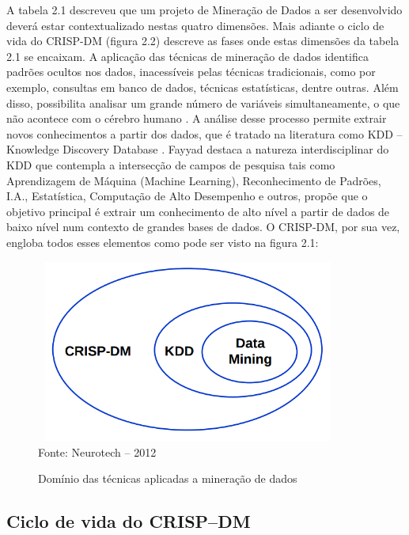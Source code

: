 A tabela 2.1 descreveu que um projeto de Mineração de Dados a ser desenvolvido deverá estar contextualizado nestas quatro dimensões. 
Mais adiante o ciclo de vida do CRISP-DM (figura 2.2) descreve as fases onde estas dimensões da tabela 2.1 se encaixam.
A aplicação das técnicas de mineração de dados identifica padrões ocultos nos dados, inacessíveis pelas técnicas tradicionais,
como por exemplo, consultas em banco de dados, técnicas estatísticas, dentre outras. Além disso, possibilita analisar um grande número de 
variáveis simultaneamente, o que não acontece com o cérebro humano \cite{possas1998data}. 
A análise desse processo permite extrair novos conhecimentos a partir dos dados, que é tratado na literatura como 
KDD -- Knowledge Discovery Database \cite{FayyadUeoutros}. Fayyad \cite{FayyadUeoutros} destaca a natureza interdisciplinar do KDD que contempla a intersecção 
de campos de pesquisa tais como Aprendizagem de Máquina (Machine Learning), Reconhecimento de Padrões, I.A., Estatística, Computação de Alto Desempenho e outros, propõe que o objetivo principal é extrair um conhecimento de alto nível a partir de dados de baixo nível num contexto de 
grandes bases de dados.
O CRISP-DM, por sua vez, engloba todos esses elementos como pode ser visto na figura 2.1:

\begin{figure}[!ht]
\centering
\caption{Domínio das técnicas aplicadas a mineração de dados}
\vspace{1mm}
\includegraphics[width=100mm, height=60mm]{Figuras/BigData/RelacaoCrispKddDm.png}\\
\tiny Fonte: Neurotech -- 2012
\end{figure}


\subsection{Ciclo de vida do CRISP--DM}

